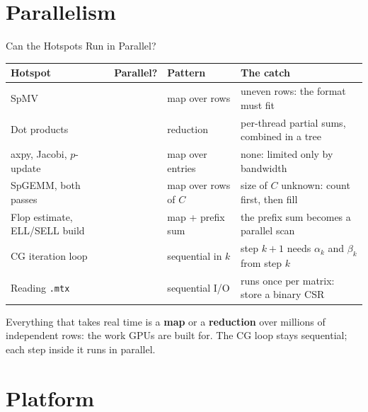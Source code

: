 \documentclass[aspectratio=169,10pt]{beamer}
\newcommand{\yes}{\colorbox{accentDark}{\makebox[2.2em]{\textcolor{white}{\scriptsize\bfseries YES}}}}
\newcommand{\no}{\colorbox{softRed}{\makebox[2.2em]{\textcolor{white}{\scriptsize\bfseries NO}}}}
\begin{document}
\section{Parallelism}

\begin{frame}{Can the Hotspots Run in Parallel?}

\vspace{0.15cm}
\footnotesize
\renewcommand{\arraystretch}{1.6}
\begin{tabularx}{\textwidth}{@{}l c l X@{}}
\toprule
\textbf{Hotspot} & \textbf{Parallel?} & \textbf{Pattern} & \textbf{The catch} \\
\midrule
SpMV & \yes & map over rows & uneven rows: the format must fit \\
Dot products & \yes & reduction & per-thread partial sums, combined in a tree \\
axpy, Jacobi, $p$-update & \yes & map over entries & none: limited only by bandwidth \\
SpGEMM, both passes & \yes & map over rows of $C$ & size of $C$ unknown: count first, then fill \\
Flop estimate, ELL/SELL build & \yes & map + prefix sum & the prefix sum becomes a parallel scan \\
\rowcolor{softRed!7}
CG iteration loop & \no & sequential in $k$ & step $k{+}1$ needs $\alpha_k$ and $\beta_k$ from step $k$ \\
\rowcolor{softRed!7}
Reading \texttt{.mtx} & \no & sequential I/O & runs once per matrix: store a binary CSR \\
\bottomrule
\end{tabularx}

\vspace{0.4cm}
\small Everything that takes real time is a \textbf{map} or a \textbf{reduction} over millions of independent rows:
the work GPUs are built for. The CG loop stays sequential; each step inside it runs in parallel.

\end{frame}

\section{Platform}
\end{document}
